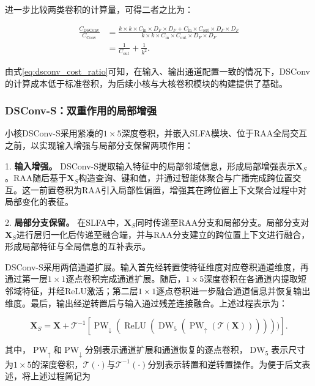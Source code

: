 进一步比较两类卷积的计算量，可得二者之比为：

\begin{equation}
\begin{aligned}
\frac{C_{\mathrm{DSConv}}}{C_{\mathrm{Conv}}}
&=
\frac{
k\times k\times C_{\mathrm{in}}\times D_F\times D_F
+
C_{\mathrm{in}}\times C_{\mathrm{out}}\times D_F\times D_F
}{
k\times k\times C_{\mathrm{in}}\times C_{\mathrm{out}}\times D_F\times D_F
} \\
&=
\frac{1}{C_{\mathrm{out}}}
+
\frac{1}{k^2}.
\end{aligned}
\label{eq:dsconv_cost_ratio}
\end{equation}

由式\eqref{eq:dsconv_cost_ratio}可知，在输入、输出通道配置一致的情况下，DSConv的计算成本低于标准卷积，为后续小核与大核卷积模块的构建提供了基础。

\subsubsection{DSConv-S：双重作用的局部增强}

小核DSConv-S采用紧凑的$1\times5$深度卷积，并嵌入SLFA模块、位于RAA全局交互之前，以实现输入增强与局部分支保留两项作用：

1. \textbf{输入增强。} DSConv-S提取输入特征中的局部邻域信息，形成局部增强表示$\mathbf X_S$。RAA随后基于$\mathbf X_S$构造查询、键和值，并通过智能体聚合与广播完成跨位置交互。这一前置卷积为RAA引入局部性偏置，增强其在跨位置上下文聚合过程中对局部变化的表征。

2. \textbf{局部分支保留。} 在SLFA中，$\mathbf X_S$同时传递至RAA分支和局部分支。局部分支对$\mathbf X_S$进行层归一化后传递至融合端，并与RAA分支建立的跨位置上下文进行融合，形成局部特征与全局信息的互补表示。

DSConv-S采用两倍通道扩展。输入首先经转置使特征维度对应卷积通道维度，再通过第一层$1\times1$逐点卷积完成通道扩展。随后，$1\times5$深度卷积在各通道内提取短邻域特征，并经ReLU激活；第二层$1\times1$逐点卷积进一步融合通道信息并恢复输出维度。最后，输出经逆转置后与输入通过残差连接融合。上述过程表示为：

\begin{equation}
\mathbf X_S
=
\mathbf X
+
\mathcal T^{-1}
[ 
\operatorname{PW}_{\downarrow}
(
\operatorname{ReLU}
(
\operatorname{DW}_{5}
(
\operatorname{PW}_{\uparrow}
(
\mathcal T(\mathbf X)
)
)
)
)
)].
\label{eq:dsconv_s}
\end{equation}

其中，$\operatorname{PW}_{\uparrow}$和$\operatorname{PW}_{\downarrow}$分别表示通道扩展和通道恢复的逐点卷积，$\operatorname{DW}_{5}$表示尺寸为$1\times5$的深度卷积，$\mathcal T(\cdot)$与$\mathcal T^{-1}(\cdot)$分别表示转置和逆转置操作。为便于后文表述，将上述过程简记为


